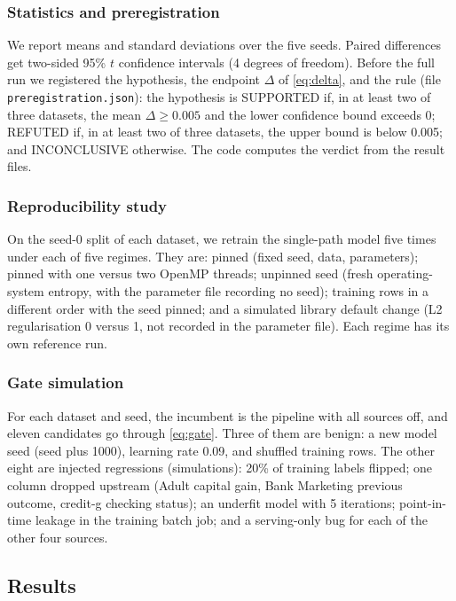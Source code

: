 \documentclass[journal]{IEEEtran}
\begin{document}
\subsubsection{Statistics and preregistration}
We report means and standard deviations over the five seeds. Paired differences get two-sided 95\% $t$ confidence intervals (4 degrees of freedom). Before the full run we registered the hypothesis, the endpoint $\Delta$ of \eqref{eq:delta}, and the rule (file \texttt{preregistration.json}): the hypothesis is SUPPORTED if, in at least two of three datasets, the mean $\Delta\ge 0.005$ and the lower confidence bound exceeds 0; REFUTED if, in at least two of three datasets, the upper bound is below 0.005; and INCONCLUSIVE otherwise. The code computes the verdict from the result files.

\subsubsection{Reproducibility study}
On the seed-0 split of each dataset, we retrain the single-path model five times under each of five regimes. They are: pinned (fixed seed, data, parameters); pinned with one versus two OpenMP threads; unpinned seed (fresh operating-system entropy, with the parameter file recording no seed); training rows in a different order with the seed pinned; and a simulated library default change (L2 regularisation 0 versus 1, not recorded in the parameter file). Each regime has its own reference run.

\subsubsection{Gate simulation}
For each dataset and seed, the incumbent is the pipeline with all sources off, and eleven candidates go through \eqref{eq:gate}. Three of them are benign: a new model seed (seed plus 1000), learning rate 0.09, and shuffled training rows. The other eight are injected regressions (simulations): 20\% of training labels flipped; one column dropped upstream (Adult capital gain, Bank Marketing previous outcome, credit-g checking status); an underfit model with 5 iterations; point-in-time leakage in the training batch job; and a serving-only bug for each of the other four sources.

\subsection{Results}
\label{sec:results}
\end{document}

